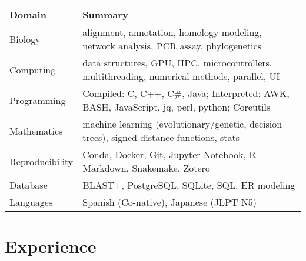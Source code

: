 \documentclass[11pt,a4paper,]{awesome-cv}
\begin{document}
\begin{tabular}{l|l}
\hline
\textbf{Domain} & \textbf{Summary}\\
\hline
Biology & alignment, annotation, homology modeling, network analysis, PCR assay, phylogenetics\\
\hline
Computing & data structures, GPU, HPC, microcontrollers, multithreading, numerical methods, parallel, UI\\
\hline
Programming & Compiled: C, C++, C\#, Java; Interpreted: AWK, BASH, JavaScript, jq, perl, python; Coreutils\\
\hline
Mathematics & machine learning (evolutionary/genetic, decision trees), signed-distance functions, stats\\
\hline
Reproducibility & Conda, Docker, Git, Jupyter Notebook, R Markdown, Snakemake, Zotero\\
\hline
Database & BLAST+, PostgreSQL, SQLite, SQL, ER modeling\\
\hline
Languages & Spanish (Co-native), Japanese (JLPT N5)\\
\hline
\end{tabular}

\hypertarget{experience}{%
\section{Experience}\label{experience}}
\end{document}
